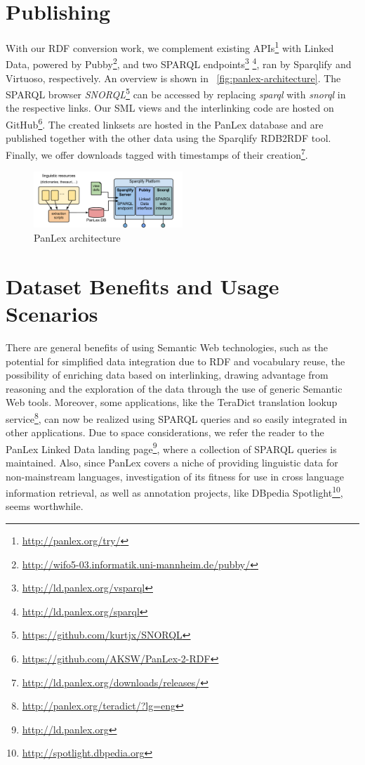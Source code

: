 \documentclass[sw]{iosart2c}
\begin{document}
\section{Publishing}
\label{sec:publishing}
With our RDF conversion work, we complement existing
APIs\footnote{\url{http://panlex.org/try/}} with Linked Data, powered by
Pubby\footnote{\tiny{\url{http://wifo5-03.informatik.uni-mannheim.de/pubby/}}},
and two SPARQL
endpoints\footnote{\url{http://ld.panlex.org/vsparql}}
\footnote{\url{http://ld.panlex.org/sparql}}, ran by Sparqlify and Virtuoso,
respectively.
An overview is shown in ~\autoref{fig:panlex-architecture}.
The SPARQL browser
\emph{SNORQL}\footnote{\url{https://github.com/kurtjx/SNORQL}} can be accessed
by replacing \emph{sparql} with \emph{snorql} in the respective links. Our SML
views and the interlinking code are hosted on GitHub\footnote{\url{https://github.com/AKSW/PanLex-2-RDF}}.
The created linksets are hosted in the PanLex database and are published together with the other data using the Sparqlify RDB2RDF tool.
Finally, we offer downloads tagged with timestamps of their creation\footnote{\url{http://ld.panlex.org/downloads/releases/}}.
\begin{figure}
\centering
\includegraphics[width=0.5\textwidth]{images/pdf/sparqlify_setup02.pdf}
\caption{PanLex architecture}
\label{fig:panlex-architecture}
\end{figure}

\section{Dataset Benefits and Usage Scenarios}
\label{sec:usage}
There are general benefits of using Semantic Web technologies, such as the
potential for simplified data integration due to RDF and vocabulary reuse, the
possibility of enriching data based on interlinking, drawing advantage from
reasoning and the exploration of the data through the use of generic Semantic
Web tools.
Moreover, some applications, like the TeraDict translation lookup
service\footnote{\url{http://panlex.org/teradict/?lg=eng}}, can now be realized
using SPARQL queries and so easily integrated in other applications.
Due to space considerations, we refer the reader to the PanLex Linked Data
landing page\footnote{\url{http://ld.panlex.org}}, where a
collection of SPARQL queries is maintained.
Also, since PanLex covers a niche of providing linguistic data for
non-mainstream languages, investigation of its fitness for use in cross
language information retrieval, as well as annotation projects, like DBpedia
Spotlight\footnote{\url{http://spotlight.dbpedia.org}}, seems worthwhile.
\end{document}
